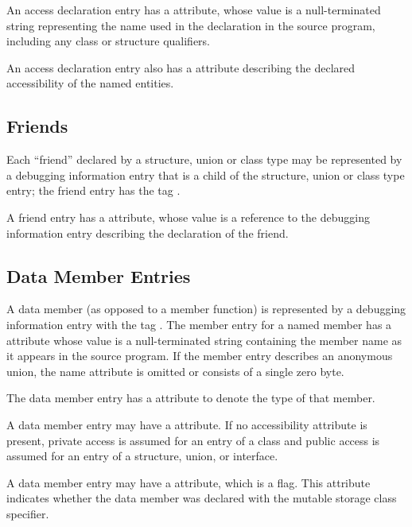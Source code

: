 An access declaration entry has a  attribute, whose
value is a null-terminated string representing the name used
in the declaration in the source program, including any class
or structure qualifiers.

An access declaration entry also has a 
attribute describing the declared accessibility of the named
entities.


\subsection{Friends}
\label{chap:friends}

Each ``friend'' declared by a structure, union or class
type may be represented by a debugging information entry
that is a child of the structure, union or class type entry;
the friend entry has the 
tag .

A friend entry has a  attribute, whose value is
a reference to the debugging information entry describing
the declaration of the friend.


\subsection{Data Member Entries}
\label{chap:datamemberentries}

A data member (as opposed to a member function) is
represented by a debugging information entry with the 
tag . 
The member entry for a named member has
a  attribute whose value is a null-terminated
string containing the member name as it appears in the source
program. If the member entry describes an anonymous union, the
name attribute is omitted or consists of a single zero byte.

The data member entry has a  attribute to denote
the type of that member.

A data member entry may have a 
attribute. If no accessibility attribute is present, private
access is assumed for an entry of a class and public access
is assumed for an entry of a structure, union, or interface.

A data member entry may have a  attribute,
which is a flag. This attribute indicates whether the data
member was declared with the mutable storage class specifier.

